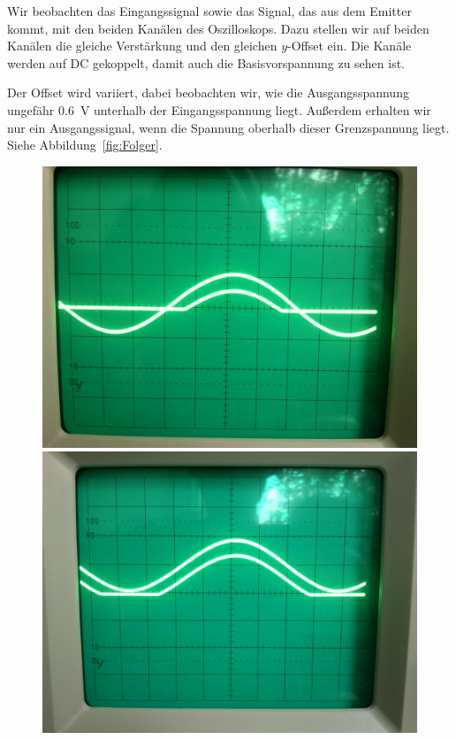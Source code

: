 Wir beobachten das Eingangssignal sowie das Signal, das aus dem Emitter kommt,
mit den beiden Kanälen des Oszilloskops. Dazu stellen wir auf beiden Kanälen
die gleiche Verstärkung und den gleichen $y$-Offset ein. Die Kanäle werden auf
DC gekoppelt, damit auch die Basisvorspannung zu sehen ist.

Der Offset wird variiert, dabei beobachten wir, wie die Ausgangsspannung
ungefähr \SI{.6}{\volt} unterhalb der Eingangsspannung liegt. Außerdem erhalten
wir nur ein Ausgangssignal, wenn die Spannung oberhalb dieser Grenzspannung
liegt. Siehe Abbildung~\ref{fig:Folger}.

\begin{figure}[htbp]
	\centering
	\begin{minipage}{.3\linewidth}
		\includegraphics[width=\linewidth]{Oszi_Foto/3-08.jpg}
	\end{minipage}
	\hfill
	\begin{minipage}{.3\linewidth}
		\includegraphics[width=\linewidth]{Oszi_Foto/3-10.jpg}

\end{minipage}
\end{figure}
